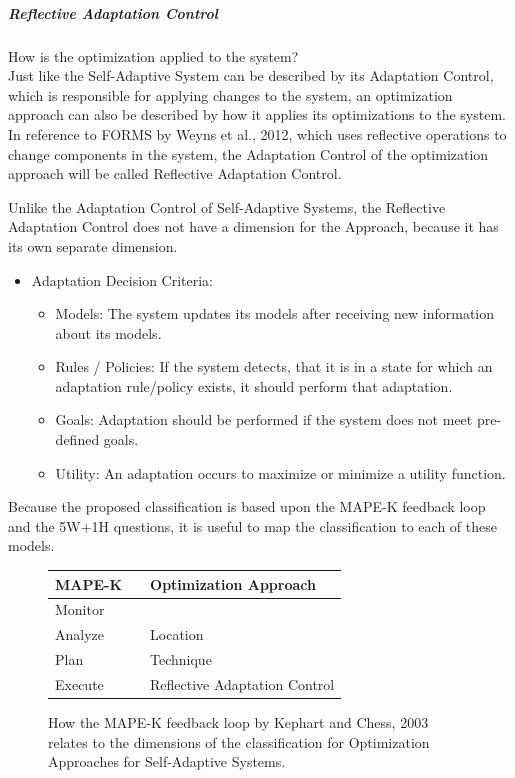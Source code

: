 \subparagraph*{Reflective Adaptation Control}
How is the optimization applied to the system? \\
Just like the Self-Adaptive System can be described by its Adaptation Control,
which is responsible for applying changes to the system,
an optimization approach can also be described by how it applies its optimizations to the system.
In reference to FORMS by Weyns et al., 2012\cite*{FORMS}, which uses reflective operations to change
components in the system, the Adaptation Control of the optimization approach will be called Reflective Adaptation Control.

Unlike the Adaptation Control of Self-Adaptive Systems, 
the Reflective Adaptation Control does not have a dimension for the Approach, because it has its own separate dimension.
\begin{itemize}
    \item Adaptation Decision Criteria: \begin{itemize}
        \item Models: The system updates its models after receiving new information about its models.
        \item Rules / Policies: If the system detects, that it is in a state for which an adaptation rule/policy exists,
        it should perform that adaptation.
        \item Goals: Adaptation should be performed if the system does not meet pre-defined goals.
        \item Utility: An adaptation occurs to maximize or minimize a utility function.
    \end{itemize}
\end{itemize}

Because the proposed classification is based upon the MAPE-K feedback loop and the 5W+1H questions,
it is useful to map the classification to each of these models.
\begin{figure}[h!]
    \centering
    \begin{tabular}{|lcl|}
        \hline
        MAPE-K & & Optimization Approach \\
        \hline
        Monitor & & \\
        \hline
        Analyze & & Location\\
        \hline
        Plan & & Technique \\
        \hline
        Execute & & Reflective Adaptation Control \\
        \hline
    \end{tabular}
    \caption{How the MAPE-K feedback loop by Kephart and Chess, 2003\cite*{VisionOfAutonomicComputing}
    relates to the dimensions of the classification for Optimization Approaches for Self-Adaptive Systems.}
\end{figure}

